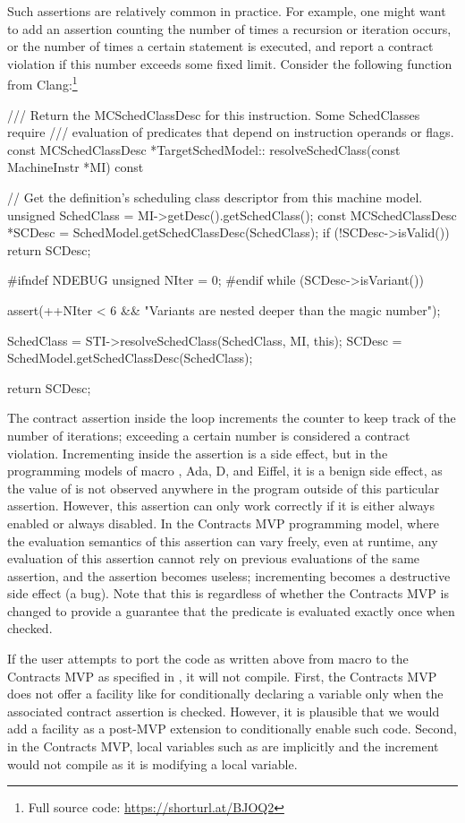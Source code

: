 Such assertions are relatively common in practice. For example, one might want to add an assertion counting the number of times a recursion or iteration occurs, or the number of times a certain statement is executed, and report a contract violation if this number exceeds some fixed limit. Consider the following function from Clang:\footnote{Full source code: \url{https://shorturl.at/BJOQ2}}
\begin{codeblock}
/// Return the MCSchedClassDesc for this instruction. Some SchedClasses require
/// evaluation of predicates that depend on instruction operands or flags.
const MCSchedClassDesc *TargetSchedModel::
resolveSchedClass(const MachineInstr *MI) const {

  // Get the definition's scheduling class descriptor from this machine model.
  unsigned SchedClass = MI->getDesc().getSchedClass();
  const MCSchedClassDesc *SCDesc = SchedModel.getSchedClassDesc(SchedClass);
  if (!SCDesc->isValid())
    return SCDesc;

#ifndef NDEBUG
  unsigned NIter = 0;
#endif
  while (SCDesc->isVariant()) {
    assert(++NIter < 6 && "Variants are nested deeper than the magic number");

    SchedClass = STI->resolveSchedClass(SchedClass, MI, this);
    SCDesc = SchedModel.getSchedClassDesc(SchedClass);
  }
  return SCDesc;
}
\end{codeblock}
The contract assertion inside the  loop increments the counter  to keep track of the number of iterations; exceeding a certain number is considered a contract violation. Incrementing  inside the assertion is a side effect, but in the programming models of macro , Ada, D, and Eiffel, it is a benign side effect, as the value of  is not observed anywhere in the program outside of this particular assertion. However, this assertion can only work correctly if it is either always enabled or always disabled. In the Contracts MVP programming model, where the evaluation semantics of this assertion can vary freely, even at runtime, any evaluation of this assertion cannot rely on previous evaluations of the same assertion, and the assertion becomes useless; incrementing  becomes a destructive side effect (a bug). Note that this is regardless of whether the Contracts MVP is changed to provide a guarantee that the predicate is evaluated exactly once when checked.

If the user attempts to port the code as written above from macro  to the Contracts MVP as specified in \cite{P2900R6}, it will not compile. First, the Contracts MVP does not offer a facility like  for conditionally declaring a variable only when the associated contract assertion is checked. However, it is plausible that we would add a facility as a post-MVP extension to conditionally enable such code. Second, in the Contracts MVP, local variables such as  are implicitly  and the increment would not compile as it is modifying a local variable.

